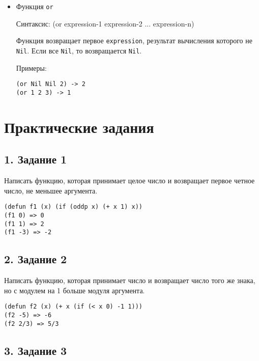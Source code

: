 \begin {itemize}
\hspace{1cm}Примеры:
\begin{lstlisting}
(and 1 Nil 2) -> %\texttt{Nil}%
(and 1 2 3) -> 3
\end{lstlisting}

\item Функция \texttt{or}

\hspace{1cm}Синтаксис: (or expression-1 expression-2 ... expression-n)

\hspace{1cm}Функция возвращает первое \texttt{expression}, результат вычисления которого не \texttt{Nil}. Если все \texttt{Nil}, то возвращается \texttt{Nil}.

\hspace{1cm}Примеры:
\begin{lstlisting}
(or Nil Nil 2) -> 2
(or 1 2 3) -> 1
\end{lstlisting}
\end{itemize}
\newpage
\section*{Практические задания}

\subsection*{1. Задание 1}

Написать функцию, которая принимает целое число и возвращает первое четное число, не меньшее аргумента.
\begin{lstlisting}
(defun f1 (x) (if (oddp x) (+ x 1) x))
(f1 0) => 0
(f1 1) => 2
(f1 -3) => -2
\end{lstlisting}

\subsection*{2. Задание 2}

Написать функцию, которая принимает число и возвращает число того же знака, но с модулем на 1 больше модуля аргумента.

\begin{lstlisting}
(defun f2 (x) (+ x (if (< x 0) -1 1)))
(f2 -5) => -6
(f2 2/3) => 5/3
\end{lstlisting}

\subsection*{3. Задание 3}

